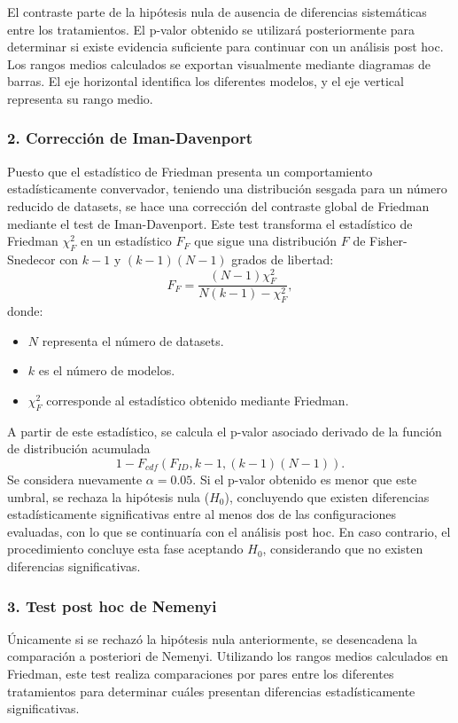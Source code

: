 \documentclass[a4paper,12pt,twoside,final]{book}
\begin{document}
El contraste parte de la hipótesis nula de ausencia de diferencias sistemáticas entre los tratamientos. El p-valor
obtenido se utilizará posteriormente para determinar si existe evidencia suficiente para continuar con un análisis
post hoc. Los rangos medios calculados se exportan visualmente mediante diagramas de barras. El eje horizontal
identifica los diferentes modelos, y el eje vertical representa su rango medio.

\subsubsection{2. Corrección de Iman-Davenport}
Puesto que el estadístico de Friedman presenta un comportamiento estadísticamente convervador, teniendo una
distribución sesgada para un número reducido de datasets, se hace una corrección del contraste global de Friedman
mediante el test de Iman-Davenport. Este test transforma el estadístico de Friedman $\chi_F^2$ en un estadístico $F_F$
que sigue una distribución $F$ de Fisher-Snedecor con $k-1$ y $(k-1)(N-1)$ grados de libertad:
\[
F_{F} = \frac{(N - 1) \chi_F^2}{N(k - 1) - \chi_F^2},
\]
donde:
\begin{itemize}
  \item $N$ representa el número de datasets.
  \item $k$ es el número de modelos.
  \item $\chi_F^2$ corresponde al estadístico obtenido mediante Friedman.
\end{itemize}

A partir de este estadístico, se calcula el p-valor asociado derivado de la función de distribución acumulada
\[
1 - F_{cdf}(F_{ID}, k - 1, (k - 1)(N - 1)).
\]
Se considera nuevamente $\alpha = 0.05$. Si el p-valor obtenido es menor que este umbral, se rechaza la hipótesis nula
($H_0$), concluyendo que existen diferencias estadísticamente significativas entre al menos dos de las configuraciones
evaluadas, con lo que se continuaría con el análisis post hoc. En caso contrario, el procedimiento concluye esta fase
aceptando $H_0$, considerando que no existen diferencias significativas.

\subsubsection{3. Test post hoc de Nemenyi}
Únicamente si se rechazó la hipótesis nula anteriormente, se desencadena la comparación a posteriori de Nemenyi.
Utilizando los rangos medios calculados en Friedman, este test realiza comparaciones por pares entre los diferentes
tratamientos para determinar cuáles presentan diferencias estadísticamente significativas.\\
\end{document}
